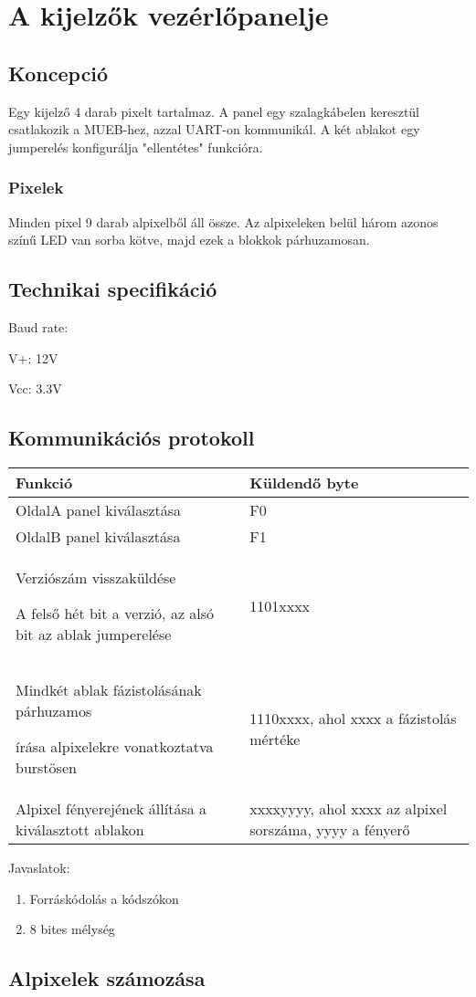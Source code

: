 \chapter{A kijelzők vezérlőpanelje}

\section{Koncepció}
Egy kijelző 4 darab pixelt tartalmaz. A panel egy szalagkábelen keresztül csatlakozik a MUEB-hez, azzal UART-on kommunikál.
A két ablakot egy jumperelés konfigurálja "ellentétes" funkcióra.

\subsection{Pixelek}
Minden pixel 9 darab alpixelből áll össze. Az alpixeleken belül három azonos színű LED van sorba kötve, majd ezek a blokkok párhuzamosan.

\section{Technikai specifikáció} %
Baud rate: %
\par
V+: 12V
\par
Vcc: 3.3V

\section{Kommunikációs protokoll}
\begin{center}
  \begin{tabularx}{\linewidth}{ L L }
    Funkció & Küldendő byte \\ \hline \hline
    OldalA panel kiválasztása & F0 \\ \hline
    OldalB panel kiválasztása & F1 \\ \hline
    Verziószám visszaküldése \par A felső hét bit a verzió, az alsó bit az ablak jumperelése & 1101xxxx \\ \hline
    Mindkét ablak fázistolásának párhuzamos \par írása alpixelekre vonatkoztatva burstösen & 1110xxxx, ahol xxxx a fázistolás mértéke  \\ \hline
    Alpixel fényerejének állítása a kiválasztott ablakon & xxxxyyyy, ahol xxxx az alpixel sorszáma, yyyy a fényerő \\ \hline
  \end{tabularx}
\end{center}

Javaslatok:
\begin{enumerate}
 \item Forráskódolás a kódszókon
 \item 8 bites mélység
\end{enumerate}

\section{Alpixelek számozása}
